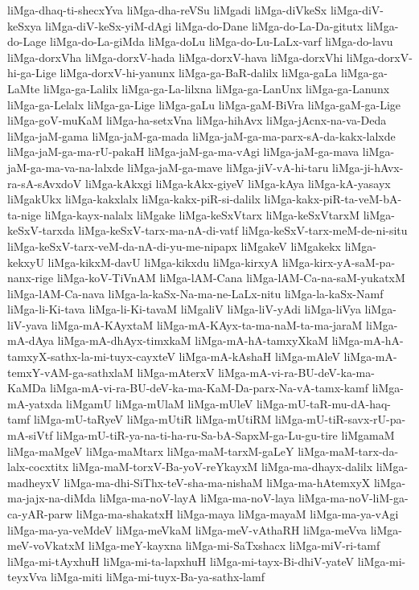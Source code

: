 {liMga-dhaq-ti-shecxYva
liMga-dha-reVSu
liMgadi
liMga-diVkeSx
liMga-diV-keSxya
liMga-diV-keSx-yiM-dAgi
liMga-do-Dane
liMga-do-La-Da-gitutx
liMga-do-Lage
liMga-do-La-giMda
liMga-doLu
liMga-do-Lu-LaLx-varf
liMga-do-lavu
liMga-dorxVha
liMga-dorxV-hada
liMga-dorxV-hava
liMga-dorxVhi
liMga-dorxV-hi-ga-Lige
liMga-dorxV-hi-yanunx
liMga-ga-BaR-dalilx
liMga-gaLa
liMga-ga-LaMte
liMga-ga-Lalilx
liMga-ga-La-lilxna
liMga-ga-LanUnx
liMga-ga-Lanunx
liMga-ga-Lelalx
liMga-ga-Lige
liMga-gaLu
liMga-gaM-BiVra
liMga-gaM-ga-Lige
liMga-goV-muKaM
liMga-ha-setxVna
liMga-hihAvx
liMga-jAcnx-na-va-Deda
liMga-jaM-gama
liMga-jaM-ga-mada
liMga-jaM-ga-ma-parx-sA-da-kakx-lalxde
liMga-jaM-ga-ma-rU-pakaH
liMga-jaM-ga-ma-vAgi
liMga-jaM-ga-mava
liMga-jaM-ga-ma-va-na-lalxde
liMga-jaM-ga-mave
liMga-jiV-vA-hi-taru
liMga-ji-hAvx-ra-sA-sAvxdoV
liMga-kAkxgi
liMga-kAkx-giyeV
liMga-kAya
liMga-kA-yasayx
liMgakUkx
liMga-kakxlalx
liMga-kakx-piR-si-dalilx
liMga-kakx-piR-ta-veM-bA-ta-nige
liMga-kayx-nalalx
liMgake
liMga-keSxVtarx
liMga-keSxVtarxM
liMga-keSxV-tarxda
liMga-keSxV-tarx-ma-nA-di-vatf
liMga-keSxV-tarx-meM-de-ni-situ
liMga-keSxV-tarx-veM-da-nA-di-yu-me-nipapx
liMgakeV
liMgakekx
liMga-kekxyU
liMga-kikxM-davU
liMga-kikxdu
liMga-kirxyA
liMga-kirx-yA-saM-pa-nanx-rige
liMga-koV-TiVnAM
liMga-lAM-Cana
liMga-lAM-Ca-na-saM-yukatxM
liMga-lAM-Ca-nava
liMga-la-kaSx-Na-ma-ne-LaLx-nitu
liMga-la-kaSx-Namf
liMga-li-Ki-tava
liMga-li-Ki-tavaM
liMgaliV
liMga-liV-yAdi
liMga-liVya
liMga-liV-yava
liMga-mA-KAyxtaM
liMga-mA-KAyx-ta-ma-naM-ta-ma-jaraM
liMga-mA-dAya
liMga-mA-dhAyx-timxkaM
liMga-mA-hA-tamxyXkaM
liMga-mA-hA-tamxyX-sathx-la-mi-tuyx-cayxteV
liMga-mA-kAshaH
liMga-mAleV
liMga-mA-temxY-vAM-ga-sathxlaM
liMga-mAterxV
liMga-mA-vi-ra-BU-deV-ka-ma-KaMDa
liMga-mA-vi-ra-BU-deV-ka-ma-KaM-Da-parx-Na-vA-tamx-kamf
liMga-mA-yatxda
liMgamU
liMga-mUlaM
liMga-mUleV
liMga-mU-taR-mu-dA-haq-tamf
liMga-mU-taRyeV
liMga-mUtiR
liMga-mUtiRM
liMga-mU-tiR-savx-rU-pa-mA-siVtf
liMga-mU-tiR-ya-na-ti-ha-ru-Sa-bA-SapxM-ga-Lu-gu-tire
liMgamaM
liMga-maMgeV
liMga-maMtarx
liMga-maM-tarxM-gaLeY
liMga-maM-tarx-da-lalx-cocxtitx
liMga-maM-torxV-Ba-yoV-reYkayxM
liMga-ma-dhayx-dalilx
liMga-madheyxV
liMga-ma-dhi-SiThx-teV-sha-ma-nishaM
liMga-ma-hAtemxyX
liMga-ma-jajx-na-diMda
liMga-ma-noV-layA
liMga-ma-noV-laya
liMga-ma-noV-liM-ga-ca-yAR-parw
liMga-ma-shakatxH
liMga-maya
liMga-mayaM
liMga-ma-ya-vAgi
liMga-ma-ya-veMdeV
liMga-meVkaM
liMga-meV-vAthaRH
liMga-meVva
liMga-meV-voVkatxM
liMga-meY-kayxna
liMga-mi-SaTxshacx
liMga-miV-ri-tamf
liMga-mi-tAyxhuH
liMga-mi-ta-lapxhuH
liMga-mi-tayx-Bi-dhiV-yateV
liMga-mi-teyxVva
liMga-miti
liMga-mi-tuyx-Ba-ya-sathx-lamf
}
